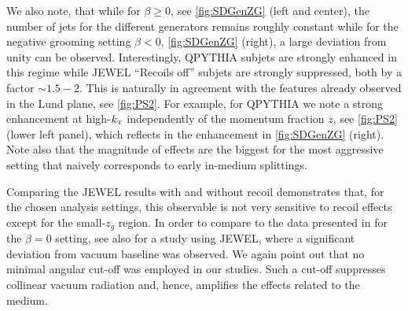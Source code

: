 We also note, that while for $\beta \geq 0$, see \autoref{fig:SDGenZG} (left and center), the number of jets for the different generators remains roughly constant while for the negative grooming setting $\beta < 0$, \autoref{fig:SDGenZG} (right), a large deviation from unity can be observed. Interestingly, QPYTHIA subjets are strongly enhanced in this regime while JEWEL ``Recoils off'' subjets are strongly suppressed, both by a factor $\sim1.5-2$. This is naturally in agreement with the features already observed in the Lund plane, see \autoref{fig:PS2}. For example, for QPYTHIA we note a strong enhancement at high-$k_{\text{\tiny T}}$ independently of the momentum fraction $z$, see \autoref{fig:PS2} (lower left panel), which reflects in the enhancement in \autoref{fig:SDGenZG} (right). Note also that the magnitude of effects are the biggest for the most aggressive setting that naively corresponds to early in-medium splittings.

Comparing the JEWEL results with and without recoil demonstrates that, for the chosen analysis settings, this observable is not very sensitive to recoil effects except for the small-$z_g$ region.
In order to compare to the data presented in \cite{Sirunyan:2017bsd} for the $\beta=0$ setting, see also \cite{Milhano:2017nzm} for a study using JEWEL, where a significant deviation from vacuum baseline was observed. We again point out that no minimal angular cut-off was employed in our studies. Such a cut-off suppresses collinear vacuum radiation and, hence, amplifies the effects related to the medium.

